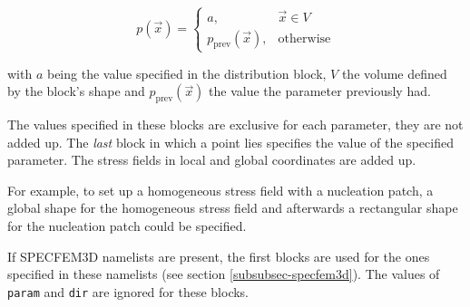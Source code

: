 \documentclass[12pt,twoside]{article}
\begin{document}
\begin{equation}
p(\vec{x}) =
\begin{cases}
 a, & \vec{x} \in V \\
 p_\text{prev}(\vec{x}), & \text{otherwise}
\end{cases}
\end{equation}

with $a$ being the value specified in the distribution block, $V$ the volume defined by the block's shape and $p_\text{prev}(\vec{x})$ the value the parameter previously had.


The values specified in these blocks are exclusive for each parameter, they are not added up. The \emph{last} block in which a point lies specifies the value of the specified parameter. The stress fields in local and global coordinates are added up.

For example, to set up a homogeneous stress field with a nucleation patch, a global shape for the homogeneous stress field and afterwards a rectangular shape for the nucleation patch could be specified.

If SPECFEM3D namelists are present, the first blocks are used for the ones specified in these namelists (see section \ref{subsubsec-specfem3d}). The values of \texttt{param} and \texttt{dir} are ignored for these blocks.

\newpage
\end{document}
